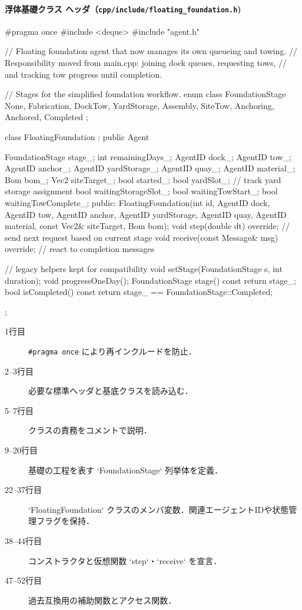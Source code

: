 \documentclass[10pt,letterpaper]{jsarticle}
\begin{document}
\paragraph{浮体基礎クラス ヘッダ（\texttt{cpp/include/floating\_foundation.h})}
\begin{cppcode}
#pragma once
#include <deque>
#include "agent.h"

// Floating foundation agent that now manages its own queueing and towing.
// Responsibility moved from main.cpp: joining dock queues, requesting tows,
// and tracking tow progress until completion.

// Stages for the simplified foundation workflow.
enum class FoundationStage {
    None,
    Fabrication,
    DockTow,
    YardStorage,
    Assembly,
    SiteTow,
    Anchoring,
    Anchored,
    Completed
};

class FloatingFoundation : public Agent {
    FoundationStage stage_;
    int remainingDays_;
    AgentID dock_;
    AgentID tow_;
    AgentID anchor_;
    AgentID yardStorage_;
    AgentID quay_;
    AgentID material_;
    Bom bom_;
    Vec2 siteTarget_;
    bool started_;
    bool yardSlot_; // track yard storage assignment
    bool waitingStorageSlot_;
    bool waitingTowStart_;
    bool waitingTowComplete_;
public:
    FloatingFoundation(int id, AgentID dock, AgentID tow, AgentID anchor,
                       AgentID yardStorage, AgentID quay,
                       AgentID material, const Vec2& siteTarget,
                       Bom bom);
    void step(double dt) override;      // send next request based on current stage
    void receive(const Message& msg) override; // react to completion messages

    // legacy helpers kept for compatibility
    void setStage(FoundationStage s, int duration);
    void progressOneDay();
    FoundationStage stage() const { return stage_; }
    bool isCompleted() const { return stage_ == FoundationStage::Completed; }
};

\end{cppcode}
\begin{description}
  \item[1行目] \lstinline|#pragma once| により再インクルードを防止．
  \item[2--3行目] 必要な標準ヘッダと基底クラスを読み込む．
  \item[5--7行目] クラスの責務をコメントで説明．
  \item[9--20行目] 基礎の工程を表す `FoundationStage` 列挙体を定義．
  \item[22--37行目] `FloatingFoundation` クラスのメンバ変数．関連エージェントIDや状態管理フラグを保持．
  \item[38--44行目] コンストラクタと仮想関数 `step`・`receive` を宣言．
  \item[47--52行目] 過去互換用の補助関数とアクセス関数．
\end{description}
\end{document}

